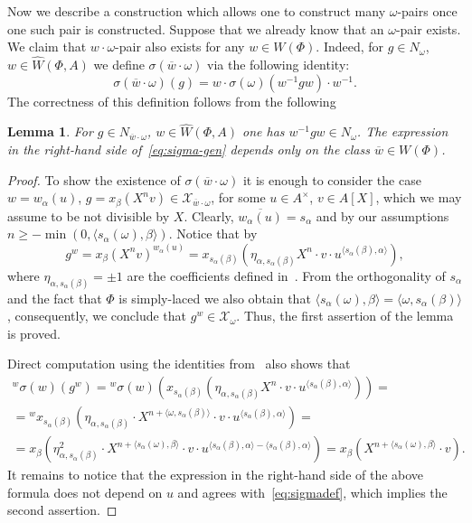 \documentclass[oneside, 10pt]{amsart}
\newcommand{\StW}{\widehat{W}}
\numberwithin{equation}{section}
\numberwithin{thm}{section}
\newtheorem{lemma}[thm]{Lemma}
\numberwithin{lemma}{section}
\theoremstyle{definition}
\theoremstyle{remark}
\begin{document}
Now we describe a construction which allows one to construct many $\omega$-pairs once one such pair is constructed.
Suppose that we already know that an $\omega$-pair exists.
We claim that $w \cdot \omega$-pair also exists for any $w \in W(\Phi).$
Indeed, for $g \in N_\omega$, $w \in \StW(\Phi, A)$ we define $\sigma(\overline{w} \cdot \omega)$ via the following identity:
\begin{equation} \label{eq:sigma-gen} \sigma(\overline{w} \cdot \omega)(g) = w \cdot \sigma(\omega)(w^{-1} g w) \cdot w^{-1}.\end{equation}
The correctness of this definition follows from the following
\begin{lemma} \label{lem:delta-weyl}
For $g \in N_{\overline{w} \cdot \omega}$, $w \in \StW(\Phi, A)$ one has $w^{-1} g w \in N_\omega$.
The expression in the right-hand side of~\eqref{eq:sigma-gen} depends only on the class $\overline{w} \in W(\Phi)$.
\end{lemma}
\begin{proof}
To show the existence of $\sigma(\overline{w}\cdot \omega)$ it is enough to consider the case $w = w_\alpha(u)$, $g = x_\beta(X^n v) \in \mathcal{X}_{\overline{w} \cdot \omega}$, for some $u \in A^\times$, $v \in A[X]$, which we may assume to be not divisible by $X$.
Clearly, $\overline{w_\alpha(u)} = s_\alpha$ and by our assumptions $n \geq -\min(0, \langle s_\alpha(\omega), \beta \rangle)$.
Notice that by~\cite[Lemme~5.1(b)]{Ma69}
\[ g^w = x_\beta(X^n v)^{w_\alpha(u)} = x_{s_\alpha(\beta)}(\eta_{\alpha, s_\alpha(\beta)} X^{n} \cdot v \cdot u^{\langle s_\alpha(\beta), \alpha \rangle}),\]
where $\eta_{\alpha, s_\alpha(\beta)} = \pm 1$ are the coefficients defined in~\cite[Lemme~5.1]{Ma69}.
From the orthogonality of $s_\alpha$ and the fact that $\Phi$ is simply-laced we also obtain that
$\langle s_\alpha(\omega), \beta \rangle = \langle \omega, s_\alpha(\beta) \rangle$, consequently, we conclude that $g^w \in \mathcal{X}_\omega$.
Thus, the first assertion of the lemma is proved.

Direct computation using the identities from~\cite[Lemma~5.1]{Ma69} also shows that
\begin{multline*}
{}^w\sigma(w)(g^w) = {}^w\sigma(w)(x_{s_\alpha(\beta)}(\eta_{\alpha, s_\alpha(\beta)} X^{n} \cdot v \cdot u^{\langle s_\alpha(\beta), \alpha \rangle})) = \\
= {}^w x_{s_\alpha(\beta)}(\eta_{\alpha, s_\alpha(\beta)} \cdot X^{n + \langle \omega, s_\alpha(\beta) \rangle} \cdot v \cdot u^{\langle s_\alpha(\beta), \alpha \rangle}) = \\
= x_{\beta}(\eta_{\alpha, s_\alpha(\beta)}^2 \cdot X^{n + \langle s_\alpha(\omega), \beta \rangle} \cdot v \cdot u^{\langle s_\alpha(\beta), \alpha \rangle - \langle s_\alpha(\beta), \alpha \rangle }) = x_{\beta}(X^{n + \langle s_\alpha(\omega), \beta \rangle} \cdot v).
\end{multline*}
It remains to notice that the expression in the right-hand side of the above formula does not depend on $u$ and agrees with~\eqref{eq:sigmadef},
which implies the second assertion. \end{proof}
\end{document}
